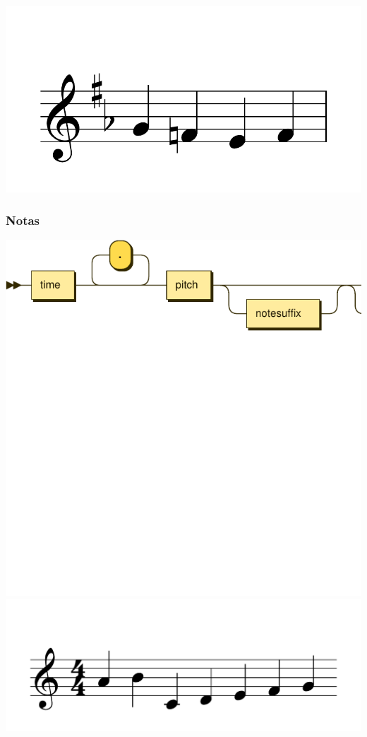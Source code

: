 \documentclass{article}
\begin{document}
\includegraphics[scale=0.5]{figures_tests/pdf/skern/keysignature3.pdf}

\subsubsection{Notas}

\includegraphics[scale=0.5]{figures_railroad/pdf/skern/notes.pdf}
\includegraphics[scale=0.5]{figures_tests/pdf/skern/notename.pdf}
\end{document}
